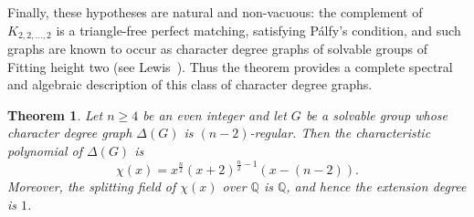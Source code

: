 \documentclass[11pt]{amsart}
\newtheorem{thm}{\bf Theorem}[section]
\begin{document}
Finally, these hypotheses are natural and non-vacuous: the complement of $K_{2,2,\dots,2}$ is a triangle-free perfect matching, satisfying Pálfy’s condition, and such graphs are known to occur as character degree graphs of solvable groups of Fitting height two (see Lewis~\cite{Lewis2006}). Thus the theorem provides a complete spectral and algebraic description of this class of character degree graphs.

\begin{thm}\label{thm:char_poly_deltaG}
Let \(n\ge4\) be an even integer and let \(G\) be a solvable group whose character degree graph \(\Delta(G)\) is \((n-2)\)-regular. Then the characteristic polynomial of \(\Delta(G)\) is
\[
\chi(x)=x^{\frac{n}{2}}(x+2)^{\frac{n}{2}-1}(x-(n-2)).
\]
Moreover, the splitting field of \(\chi(x)\) over \(\mathbb{Q}\) is \(\mathbb{Q}\), and hence the extension degree is \(1\).
\end{thm}
\end{document}

